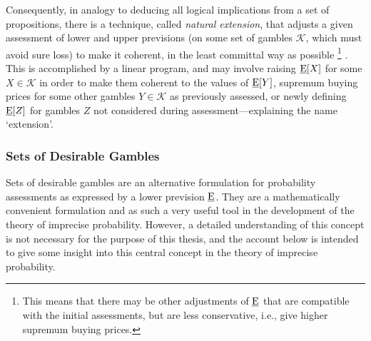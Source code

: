 Consequently, in analogy to deducing all logical implications from
a set of propositions, there is a technique, %
called \emph{natural extension}, that adjusts
a given assessment of lower and upper previsions (on some set of gambles $\mathcal{K}$, which must avoid sure loss)
to make it coherent, in the least committal way as possible%
\footnote{This means that there may be other adjustments of $\underline{\operatorname{E}}$ that are compatible
with the initial assessments, but are less conservative,
i.e., give higher supremum buying prices.}
\parencite[see, e.g.,][pp.~15ff]{1996:walley::expert}.
This is accomplished by a linear program,
and may involve raising $\underline{\operatorname{E}}[X]$ for some $X \in \mathcal{K}$ in order to make them
coherent to the values of $\underline{\operatorname{E}}[Y]$, supremum buying prices for some other gambles $Y \in \mathcal{K}$ as previously assessed,
or newly defining $\underline{\operatorname{E}}[Z]$ for gambles $Z$ not considered during assessment---explaining the name `extension'.

\subsubsection{Sets of Desirable Gambles}

Sets of desirable gambles \parencites[\S 6]{2000:walley::towards}{itip-desirable} are an alternative formulation
for probability assessments as expressed by a lower prevision $\underline{\operatorname{E}}$.
They are a mathematically convenient formulation
and as such a very useful tool in the development of the theory of imprecise probability.
However, a detailed understanding of this concept is not necessary for the purpose of this thesis,
and the account below is intended to give some insight into this central concept in the theory of imprecise probability.

